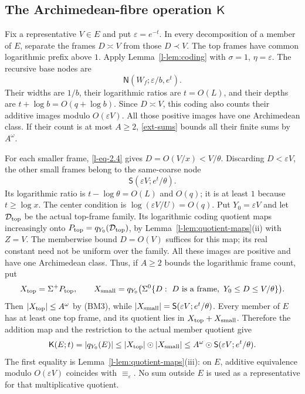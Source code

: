 \documentclass[11pt]{article}
\theoremstyle{definition}
\theoremstyle{remark}
\newcommand{\arch}{\mathrel{\asymp}}
\newcommand{\od}{\mathbin{\odot}}
\newcommand{\NN}{\mathsf N}
\newcommand{\SSS}{\mathsf S}
\newcommand{\KK}{\mathsf K}
\numberwithin{equation}{section}
\begin{document}
\subsection{The Archimedean-fibre operation \texorpdfstring{$\KK$}{K}}\label{l-sec:K}

Fix a representative $V\in E$ and put $\varepsilon=e^{-t}$.
In every decomposition of a member of $E$, separate the frames
$D\arch V$ from those $D\prec V$.
The top frames have common logarithmic prefix above $1$.
Apply Lemma~\ref{l-lem:coding} with $\sigma=1$, $\eta=\varepsilon$.
The recursive base nodes are
\begin{equation}
 \NN(W_f;\varepsilon/b,e^t).
 \label{l-eq-6.16}
\end{equation}
Their widths are $1/b$, their logarithmic ratios are $t=O(L)$,
and their depths are $t+\log b=O(q+\log b)$.
Since $D\arch V$, this coding also counts their additive images
modulo $O(\varepsilon V)$.
All those positive images have one Archimedean class.
If their count is at most $A\ge2$, \eqref{ext-sums} bounds all their finite sums
by $A^\omega$.

For each smaller frame, \eqref{l-eq-2.4} gives $D=O(V/x)<V/\theta$.
Discarding $D<\varepsilon V$, the other small frames belong to
the same-coarse node
\begin{equation}
 \SSS(\varepsilon V;e^t/\theta).
 \label{l-eq-6.17}
\end{equation}
Its logarithmic ratio is $t-\log\theta=O(L)$ and $O(q)$;
it is at least $1$ because $t\ge\log x$.
The center condition is $\log(\varepsilon V/U)=O(q)$.
Put $Y_0=\varepsilon V$ and let
$\mathcal D_{\rm top}$ be the actual top-frame family.
Its logarithmic coding quotient maps increasingly onto
$P_{\rm top}=q_{Y_0}(\mathcal D_{\rm top})$, by
Lemma~\ref{l-lem:quotient-maps}(ii) with $Z=V$.
The memberwise bound $D=O(V)$ suffices for this map; its real
constant need not be uniform over the family.  All these images
are positive and have one Archimedean class.  Thus, if $A\ge2$ bounds the
logarithmic frame count, put
\[
 X_{\rm top}=\Sigma^+P_{\rm top},\qquad
 X_{\rm small}=q_{Y_0}\bigl(\Sigma^0\{D:\ D\text{ is a frame},\
                                  Y_0\le D\le V/\theta\}\bigr).
\]
Then $|X_{\rm top}|\le A^\omega$ by (BM3), while
$|X_{\rm small}|=\SSS(\varepsilon V;e^t/\theta)$.
Every member of $E$ has at least one top frame, and its quotient
lies in $X_{\rm top}+X_{\rm small}$.  Therefore the addition map
and the restriction to the actual member quotient give
\begin{equation}
 \KK(E;t)=|q_{Y_0}(E)|
 \le |X_{\rm top}|\od|X_{\rm small}|
 \le A^\omega\od\SSS(\varepsilon V;e^t/\theta).
 \label{l-eq:K-assembly}
\end{equation}
The first equality is Lemma~\ref{l-lem:quotient-maps}(iii): on
$E$, additive equivalence modulo $O(\varepsilon V)$ coincides
with $\equiv_\varepsilon$.  No sum outside $E$ is used as a
representative for that multiplicative quotient.
\end{document}
